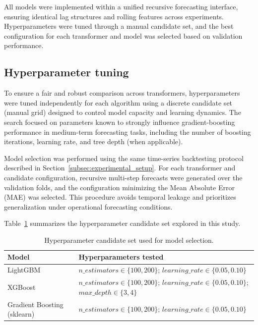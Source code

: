 All models were implemented within a unified recursive forecasting interface, ensuring identical lag structures and rolling features across experiments. Hyperparameters were tuned through a manual candidate set, and the best configuration for each transformer and model was selected based on validation performance.
\subsection{Hyperparameter tuning}
\label{subsec:hyperparameter_tuning}

To ensure a fair and robust comparison across transformers, hyperparameters were tuned independently for each algorithm using a discrete candidate set (manual grid) designed to control model capacity and learning dynamics. The search focused on parameters known to strongly influence gradient-boosting performance in medium-term forecasting tasks, including the number of boosting iterations, learning rate, and tree depth (when applicable). 

Model selection was performed using the same time-series backtesting protocol described in Section~\ref{subsec:experimental_setup}. For each transformer and candidate configuration, recursive multi-step forecasts were generated over the validation folds, and the configuration minimizing the Mean Absolute Error (MAE) was selected. This procedure avoids temporal leakage and prioritizes generalization under operational forecasting conditions.

Table~\ref{tab:hyperparams} summarizes the hyperparameter candidate set explored in this study.

\begin{table}[t]
\centering
\caption{Hyperparameter candidate set used for model selection.}
\label{tab:hyperparams}
\footnotesize
\begin{tabular}{p{3.2cm} p{5.6cm}}
\toprule
\textbf{Model} & \textbf{Hyperparameters tested} \\
\midrule
LightGBM & $n\_estimators \in \{100, 200\}$; $learning\_rate \in \{0.05, 0.10\}$ \\
\midrule
XGBoost & $n\_estimators \in \{100, 200\}$; $learning\_rate \in \{0.05, 0.10\}$; $max\_depth \in \{3, 4\}$ \\
\midrule
Gradient Boosting (sklearn) & $n\_estimators \in \{100, 200\}$; $learning\_rate \in \{0.05, 0.10\}$ \\
\bottomrule
\end{tabular}
\end{table}


